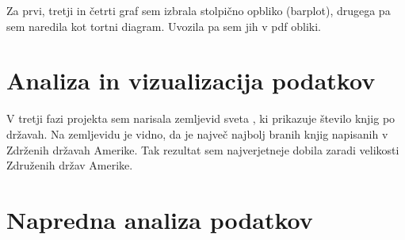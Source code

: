 \documentclass[11pt,a4paper]{article}
\begin{document}
Za prvi, tretji in četrti graf sem izbrala stolpično opbliko (barplot), drugega pa sem naredila kot tortni diagram. Uvozila pa sem jih v pdf obliki. 







\section{Analiza in vizualizacija podatkov}


V tretji fazi projekta sem narisala zemljevid sveta , ki prikazuje število knjig po državah. Na zemljevidu je vidno, da je največ najbolj branih knjig napisanih v Zdrženih državah Amerike. Tak rezultat sem najverjetneje dobila zaradi velikosti Združenih držav Amerike. 




\section{Napredna analiza podatkov}




\begin{center}


\end{center}
\end{document}
